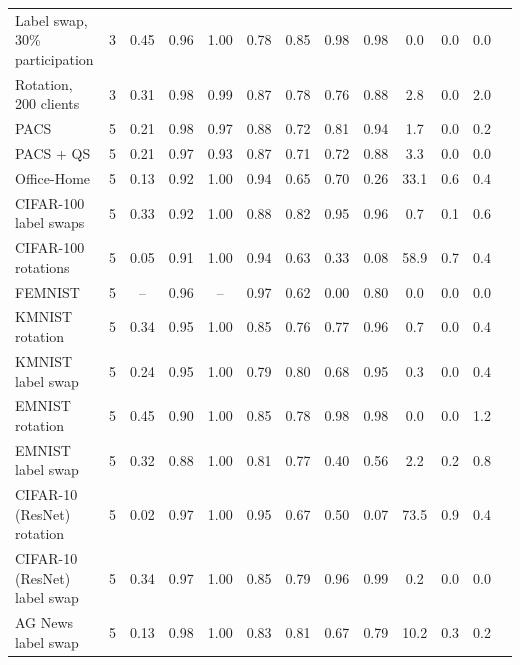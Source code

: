 {{\begin{tabular}{l r c c c c c c c c c c c}
Label swap, 30\% participation & 3 & 0.45 & 0.96 & 1.00 & 0.78 & 0.85 & 0.98 & 0.98 & 0.0 & 0.0 & 0.0 \\
Rotation, 200 clients & 3 & 0.31 & 0.98 & 0.99 & 0.87 & 0.78 & 0.76 & 0.88 & 2.8 & 0.0 & 2.0 \\
PACS & 5 & 0.21 & 0.98 & 0.97 & 0.88 & 0.72 & 0.81 & 0.94 & 1.7 & 0.0 & 0.2 \\
PACS + QS & 5 & 0.21 & 0.97 & 0.93 & 0.87 & 0.71 & 0.72 & 0.88 & 3.3 & 0.0 & 0.0 \\
Office-Home & 5 & 0.13 & 0.92 & 1.00 & 0.94 & 0.65 & 0.70 & 0.26 & 33.1 & 0.6 & 0.4 \\
CIFAR-100 label swaps & 5 & 0.33 & 0.92 & 1.00 & 0.88 & 0.82 & 0.95 & 0.96 & 0.7 & 0.1 & 0.6 \\
CIFAR-100 rotations & 5 & 0.05 & 0.91 & 1.00 & 0.94 & 0.63 & 0.33 & 0.08 & 58.9 & 0.7 & 0.4 \\
FEMNIST & 5 & -- & 0.96 & -- & 0.97 & 0.62 & 0.00 & 0.80 & 0.0 & 0.0 & 0.0 \\
KMNIST rotation & 5 & 0.34 & 0.95 & 1.00 & 0.85 & 0.76 & 0.77 & 0.96 & 0.7 & 0.0 & 0.4 \\
KMNIST label swap & 5 & 0.24 & 0.95 & 1.00 & 0.79 & 0.80 & 0.68 & 0.95 & 0.3 & 0.0 & 0.4 \\
EMNIST rotation & 5 & 0.45 & 0.90 & 1.00 & 0.85 & 0.78 & 0.98 & 0.98 & 0.0 & 0.0 & 1.2 \\
EMNIST label swap & 5 & 0.32 & 0.88 & 1.00 & 0.81 & 0.77 & 0.40 & 0.56 & 2.2 & 0.2 & 0.8 \\
CIFAR-10 (ResNet) rotation & 5 & 0.02 & 0.97 & 1.00 & 0.95 & 0.67 & 0.50 & 0.07 & 73.5 & 0.9 & 0.4 \\
CIFAR-10 (ResNet) label swap & 5 & 0.34 & 0.97 & 1.00 & 0.85 & 0.79 & 0.96 & 0.99 & 0.2 & 0.0 & 0.0 \\
AG News label swap & 5 & 0.13 & 0.98 & 1.00 & 0.83 & 0.81 & 0.67 & 0.79 & 10.2 & 0.3 & 0.2 \\
\bottomrule
\end{tabular}}
}
